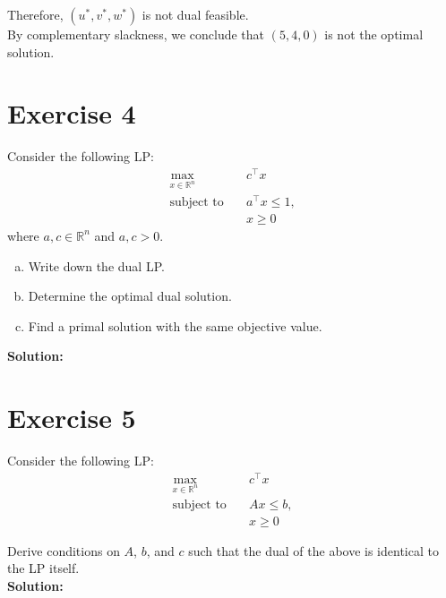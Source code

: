 \documentclass{article}
\begin{document}
Therefore, $(u^*, v^*, w^*)$ is not dual feasible. \\

By complementary slackness, we conclude that $(5,4,0)$ is not the optimal solution.

\newpage

\section*{Exercise 4}
Consider the following LP:
\begin{align*}
\max_{x \in \mathbb{R}^n} \quad & c^{\top} x \\
\text{subject to} \quad & a^{\top} x \leq 1, \\
& x \geq 0
\end{align*}
where $a, c \in \mathbb{R}^n$ and $a, c > 0$.

\begin{enumerate}[(a)]
    \item Write down the dual LP.
    \item Determine the optimal dual solution.
    \item Find a primal solution with the same objective value.
\end{enumerate}

\textbf{Solution:}



\newpage

\section*{Exercise 5}
Consider the following LP:
\begin{align*}
\max_{x \in \mathbb{R}^n} \quad & c^{\top} x \\
\text{subject to} \quad & Ax \leq b, \\
& x \geq 0
\end{align*}

Derive conditions on $A$, $b$, and $c$ such that the dual of the above is identical to the LP itself. \\

\textbf{Solution:}
\end{document}
